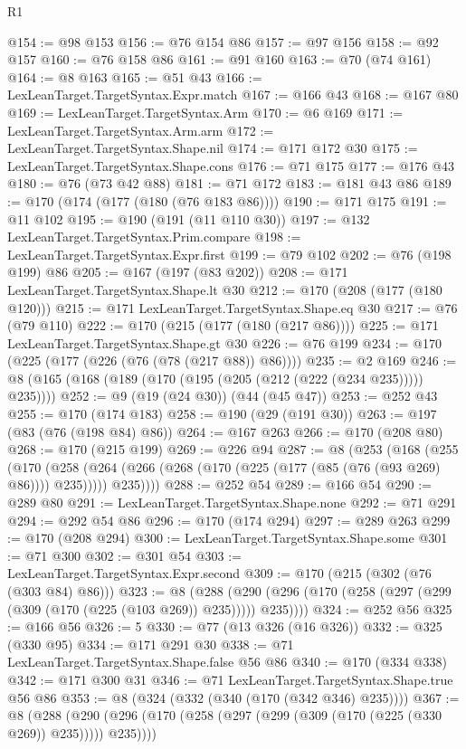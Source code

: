 \begin{lexlean}{R1}
\begin{coremodule}
@154 := @98 @153
@156 := @76 @154 @86
@157 := @97 @156
@158 := @92 @157
@160 := @76 @158 @86
@161 := @91 @160
@163 := @70 (@74 @161)
@164 := @8 @163
@165 := @51 @43
@166 := LexLeanTarget.TargetSyntax.Expr.match
@167 := @166 @43
@168 := @167 @80
@169 := LexLeanTarget.TargetSyntax.Arm
@170 := @6 @169
@171 := LexLeanTarget.TargetSyntax.Arm.arm
@172 := LexLeanTarget.TargetSyntax.Shape.nil
@174 := @171 @172 @30
@175 := LexLeanTarget.TargetSyntax.Shape.cons
@176 := @71 @175
@177 := @176 @43
@180 := @76 (@73 @42 @88)
@181 := @71 @172
@183 := @181 @43 @86
@189 := @170 (@174 (@177 (@180 (@76 @183 @86))))
@190 := @171 @175
@191 := @11 @102
@195 := @190 (@191 (@11 @110 @30))
@197 := @132 LexLeanTarget.TargetSyntax.Prim.compare
@198 := LexLeanTarget.TargetSyntax.Expr.first
@199 := @79 @102
@202 := @76 (@198 @199) @86
@205 := @167 (@197 (@83 @202))
@208 := @171 LexLeanTarget.TargetSyntax.Shape.lt @30
@212 := @170 (@208 (@177 (@180 @120)))
@215 := @171 LexLeanTarget.TargetSyntax.Shape.eq @30
@217 := @76 (@79 @110)
@222 := @170 (@215 (@177 (@180 (@217 @86))))
@225 := @171 LexLeanTarget.TargetSyntax.Shape.gt @30
@226 := @76 @199
@234 := @170 (@225 (@177 (@226 (@76 (@78 (@217 @88)) @86))))
@235 := @2 @169
@246 := @8 (@165 (@168 (@189 (@170 (@195 (@205 (@212 (@222 (@234 @235))))) @235))))
@252 := @9 (@19 (@24 @30)) (@44 (@45 @47))
@253 := @252 @43
@255 := @170 (@174 @183)
@258 := @190 (@29 (@191 @30))
@263 := @197 (@83 (@76 (@198 @84) @86))
@264 := @167 @263
@266 := @170 (@208 @80)
@268 := @170 (@215 @199)
@269 := @226 @94
@287 := @8
    (@253
      (@168
        (@255
          (@170
            (@258 (@264 (@266 (@268 (@170 (@225 (@177 (@85 (@76 (@93 @269) @86)))) @235)))))
            @235))))
@288 := @252 @54
@289 := @166 @54
@290 := @289 @80
@291 := LexLeanTarget.TargetSyntax.Shape.none
@292 := @71 @291
@294 := @292 @54 @86
@296 := @170 (@174 @294)
@297 := @289 @263
@299 := @170 (@208 @294)
@300 := LexLeanTarget.TargetSyntax.Shape.some
@301 := @71 @300
@302 := @301 @54
@303 := LexLeanTarget.TargetSyntax.Expr.second
@309 := @170 (@215 (@302 (@76 (@303 @84) @86)))
@323 := @8
    (@288 (@290 (@296 (@170 (@258 (@297 (@299 (@309 (@170 (@225 (@103 @269)) @235))))) @235))))
@324 := @252 @56
@325 := @166 @56
@326 := 5
@330 := @77 (@13 @326 (@16 @326))
@332 := @325 (@330 @95)
@334 := @171 @291 @30
@338 := @71 LexLeanTarget.TargetSyntax.Shape.false @56 @86
@340 := @170 (@334 @338)
@342 := @171 @300 @31
@346 := @71 LexLeanTarget.TargetSyntax.Shape.true @56 @86
@353 := @8 (@324 (@332 (@340 (@170 (@342 @346) @235))))
@367 := @8
    (@288 (@290 (@296 (@170 (@258 (@297 (@299 (@309 (@170 (@225 (@330 @269)) @235))))) @235))))

\end{coremodule}
\end{lexlean}
